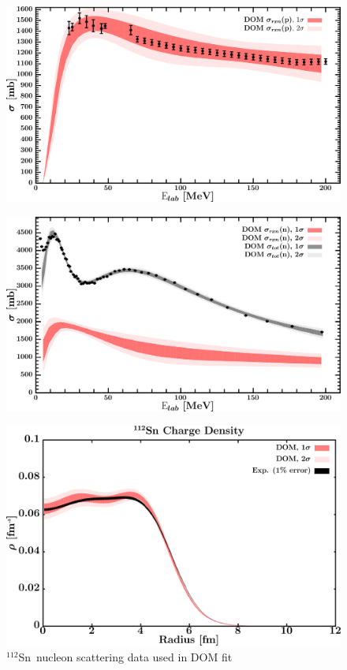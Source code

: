 \documentclass[twocolumn,secnumarabic,amssymb, nobibnotes, aps, prl,
superscriptaddress, nobalancelastpage, draft]{revtex4}
\newcommand{\snTwelve}{\ensuremath{^{112}}S\lowercase{n}}
\begin{document}
\begin{figure}[!htb]
\begin{minipage}{0.4\linewidth}
        \centering
        \includegraphics[width=\linewidth]{figures/sn112_protonInelastic.png}
        \label{DOM_sn112_proton_inelastic}
    \end{minipage}\hspace{6pt}
    \begin{minipage}{0.4\linewidth}
        \centering
        \includegraphics[width=\linewidth]{figures/sn112_neutronInelastic.png}
        \label{DOM_sn112_neutron_inelastic}
    \end{minipage}
    \caption{\snTwelve\ nucleon scattering data used in DOM fit}
    \label{DOM_sn112_scattering}
    \centering
    \begin{minipage}{0.4\linewidth}
        \centering
        \includegraphics[width=\linewidth]{figures/sn112_chargeDensity.png}

\end{minipage}
\end{figure}
\end{document}
